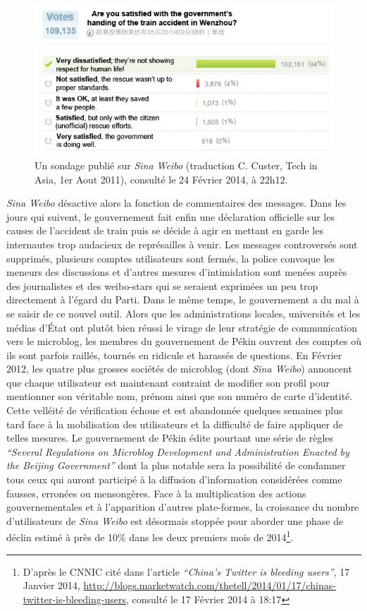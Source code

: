 \begin{figure}[htbp]
    \centering
    \includegraphics[scale=0.7]{figures/chap1/train.jpg}
    \caption[Sondage Weibo concernant l'accident de train de Wenzhou]{Un sondage publié sur \textit{Sina Weibo} (traduction C. Custer, Tech in Asia, 1er Aout 2011), consulté le 24 Février 2014, à 22h12.}
    \label{fig:poll_weibo}
\end{figure}

\textit{Sina Weibo} désactive alors la fonction de commentaires des messages. Dans les jours qui suivent, le gouvernement fait enfin une déclaration officielle sur les causes de l’accident de train puis se décide à agir en mettant en garde les internautes trop audacieux de représailles à venir. Les messages controversés sont supprimés, plusieurs comptes utilisateurs sont fermés, la police convoque les meneurs des discussions et d’autres mesures d’intimidation sont menées auprès des journalistes et des weibo-stars qui se seraient exprimées un peu trop directement à l’égard du Parti. Dans le même temps, le gouvernement a du mal à se saisir de ce nouvel outil. Alors que les administrations locales, universités et les médias d’État ont plutôt bien réussi le virage de leur stratégie de communication vers le microblog, les membres du gouvernement de Pékin ouvrent des comptes où ils sont parfois raillés, tournés en ridicule et harassés de questions. En Février 2012, les quatre plus grosses sociétés de microblog (dont \textit{Sina Weibo}) annoncent que chaque utilisateur est maintenant contraint de modifier son profil pour mentionner son véritable nom, prénom ainsi que son numéro de carte d’identité. Cette velléité de vérification échoue et est abandonnée quelques semaines plus tard face à la mobilisation des utilisateurs et la difficulté de faire appliquer de telles mesures. Le gouvernement de Pékin édite pourtant une série de règles \textit{“Several Regulations on Microblog Development and Administration Enacted by the Beijing Government”} dont la plus notable sera la possibilité de condamner tous ceux qui auront participé à la diffusion d’information considérées comme fausses, erronées ou mensongères. Face à la multiplication des actions gouvernementales et à l’apparition d’autres plate-formes, la croissance du nombre d’utilisateurs de \textit{Sina Weibo} est désormais stoppée pour aborder une phase de déclin estimé à près de 10\% dans les deux premiers mois de 2014\footnote{D’après le CNNIC cité dans l’article  \textit{“China’s Twitter is bleeding users”}, 17 Janvier 2014, \url{http://blogs.marketwatch.com/thetell/2014/01/17/chinas-twitter-is-bleeding-users}, consulté le 17 Février 2014 à 18:17}. 

